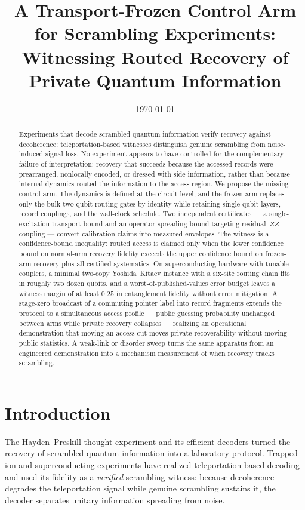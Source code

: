 \documentclass[11pt]{article}
\title{A Transport-Frozen Control Arm for Scrambling Experiments:\\
Witnessing Routed Recovery of Private Quantum Information}
\author{}
\date{\today}
\begin{document}
\maketitle

\begin{abstract}
Experiments that decode scrambled quantum information verify recovery
against decoherence: teleportation-based witnesses distinguish genuine
scrambling from noise-induced signal loss.  No experiment appears to
have controlled for the complementary failure of interpretation:
recovery that succeeds because the accessed records were prearranged,
nonlocally encoded, or dressed with side information, rather than
because internal dynamics routed the information to the access region.
We propose the missing control arm.  The dynamics is defined at the
circuit level, and the frozen arm replaces only the bulk two-qubit
routing gates by identity while retaining single-qubit layers, record
couplings, and the wall-clock schedule.  Two independent certificates
--- a single-excitation transport bound and an operator-spreading
bound targeting residual~$ZZ$ coupling --- convert calibration claims
into measured envelopes.  The witness is a confidence-bound
inequality: routed access is claimed only when the lower confidence
bound on normal-arm recovery fidelity exceeds the upper confidence
bound on frozen-arm recovery plus all certified systematics.  On
superconducting hardware with tunable couplers, a minimal two-copy
Yoshida--Kitaev instance with a six-site routing chain fits in
roughly two dozen qubits, and a worst-of-published-values error budget
leaves a witness margin of at least $0.25$ in entanglement fidelity
without error mitigation.  A stage-zero broadcast of a commuting
pointer label into record fragments extends the protocol to a
simultaneous access profile --- public guessing probability unchanged
between arms while private recovery collapses --- realizing an
operational demonstration that moving an access cut moves private
recoverability without moving public statistics.  A weak-link or
disorder sweep turns the same apparatus from an engineered
demonstration into a mechanism measurement of when recovery tracks
scrambling.
\end{abstract}

\section{Introduction}
\label{sec:intro}

The Hayden--Preskill thought experiment \citep{HaydenPreskill2007}
and its efficient decoders \citep{YoshidaKitaev2017} turned the
recovery of scrambled quantum information into a laboratory protocol.
Trapped-ion \citep{Landsman2019} and superconducting
\citep{Blok2021,Mi2021,Wang2021} experiments have realized
teleportation-based decoding and used its fidelity as a
\emph{verified} scrambling witness: because decoherence degrades the
teleportation signal while genuine scrambling sustains it, the decoder
separates unitary information spreading from noise.
\end{document}
